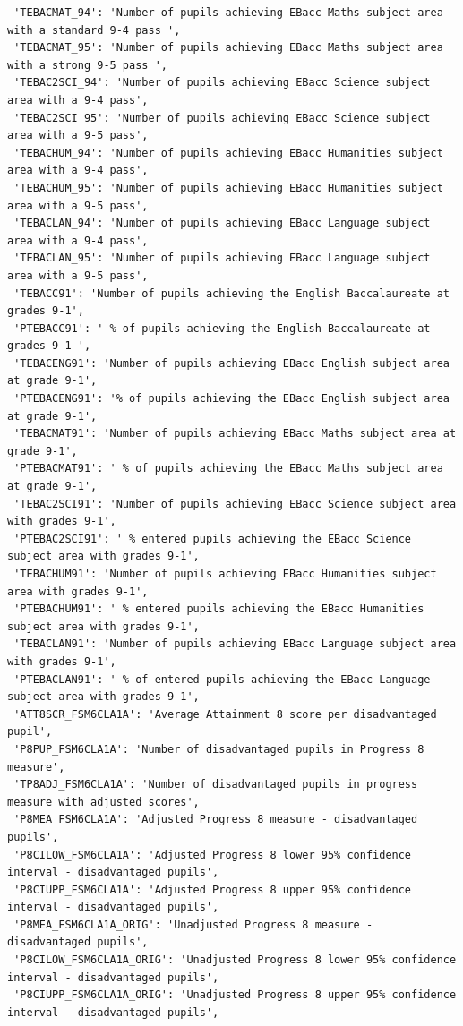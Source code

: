 \documentclass[
  letterpaper,
  DIV=11,
  numbers=noendperiod]{scrartcl}
\begin{document}
\begin{verbatim}
 'TEBACMAT_94': 'Number of pupils achieving EBacc Maths subject area with a standard 9-4 pass ',
 'TEBACMAT_95': 'Number of pupils achieving EBacc Maths subject area with a strong 9-5 pass ',
 'TEBAC2SCI_94': 'Number of pupils achieving EBacc Science subject area with a 9-4 pass',
 'TEBAC2SCI_95': 'Number of pupils achieving EBacc Science subject area with a 9-5 pass',
 'TEBACHUM_94': 'Number of pupils achieving EBacc Humanities subject area with a 9-4 pass',
 'TEBACHUM_95': 'Number of pupils achieving EBacc Humanities subject area with a 9-5 pass',
 'TEBACLAN_94': 'Number of pupils achieving EBacc Language subject area with a 9-4 pass',
 'TEBACLAN_95': 'Number of pupils achieving EBacc Language subject area with a 9-5 pass',
 'TEBACC91': 'Number of pupils achieving the English Baccalaureate at grades 9-1',
 'PTEBACC91': ' % of pupils achieving the English Baccalaureate at grades 9-1 ',
 'TEBACENG91': 'Number of pupils achieving EBacc English subject area at grade 9-1',
 'PTEBACENG91': '% of pupils achieving the EBacc English subject area at grade 9-1',
 'TEBACMAT91': 'Number of pupils achieving EBacc Maths subject area at grade 9-1',
 'PTEBACMAT91': ' % of pupils achieving the EBacc Maths subject area at grade 9-1',
 'TEBAC2SCI91': 'Number of pupils achieving EBacc Science subject area with grades 9-1',
 'PTEBAC2SCI91': ' % entered pupils achieving the EBacc Science subject area with grades 9-1',
 'TEBACHUM91': 'Number of pupils achieving EBacc Humanities subject area with grades 9-1',
 'PTEBACHUM91': ' % entered pupils achieving the EBacc Humanities subject area with grades 9-1',
 'TEBACLAN91': 'Number of pupils achieving EBacc Language subject area with grades 9-1',
 'PTEBACLAN91': ' % of entered pupils achieving the EBacc Language subject area with grades 9-1',
 'ATT8SCR_FSM6CLA1A': 'Average Attainment 8 score per disadvantaged pupil',
 'P8PUP_FSM6CLA1A': 'Number of disadvantaged pupils in Progress 8 measure',
 'TP8ADJ_FSM6CLA1A': 'Number of disadvantaged pupils in progress measure with adjusted scores',
 'P8MEA_FSM6CLA1A': 'Adjusted Progress 8 measure - disadvantaged pupils',
 'P8CILOW_FSM6CLA1A': 'Adjusted Progress 8 lower 95% confidence interval - disadvantaged pupils',
 'P8CIUPP_FSM6CLA1A': 'Adjusted Progress 8 upper 95% confidence interval - disadvantaged pupils',
 'P8MEA_FSM6CLA1A_ORIG': 'Unadjusted Progress 8 measure - disadvantaged pupils',
 'P8CILOW_FSM6CLA1A_ORIG': 'Unadjusted Progress 8 lower 95% confidence interval - disadvantaged pupils',
 'P8CIUPP_FSM6CLA1A_ORIG': 'Unadjusted Progress 8 upper 95% confidence interval - disadvantaged pupils',

\end{verbatim}
\end{document}
